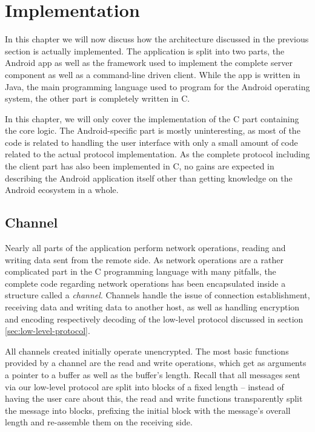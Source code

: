\section{Implementation}

In this chapter we will now discuss how the architecture discussed in the previous section is actually implemented.
The application is split into two parts, the Android app as well as the framework used to implement the complete server component as well as a command-line driven client.
While the app is written in Java, the main programming language used to program for the Android operating system, the other part is completely written in C.

In this chapter, we will only cover the implementation of the C part containing the core logic.
The Android-specific part is mostly uninteresting, as most of the code is related to handling the user interface with only a small amount of code related to the actual protocol implementation.
As the complete protocol including the client part has also been implemented in C, no gains are expected in describing the Android application itself other than getting knowledge on the Android ecosystem in a whole.

\subsection{Channel}
\label{sec:channel}

Nearly all parts of the application perform network operations, reading and writing data sent from the remote side.
As network operations are a rather complicated part in the C programming language with many pitfalls, the complete code regarding network operations has been encapsulated inside a structure called a \emph{channel}.
Channels handle the issue of connection establishment, receiving data and writing data to another host, as well as handling encryption and encoding respectively decoding of the low-level protocol discussed in section \ref{sec:low-level-protocol}.

All channels created initially operate unencrypted.
The most basic functions provided by a channel are the read and write operations, which get as arguments a pointer to a buffer as well as the buffer's length.
Recall that all messages sent via our low-level protocol are split into blocks of a fixed length -- instead of having the user care about this, the read and write functions transparently split the message into blocks, prefixing the initial block with the message's overall length and re-assemble them on the receiving side.

